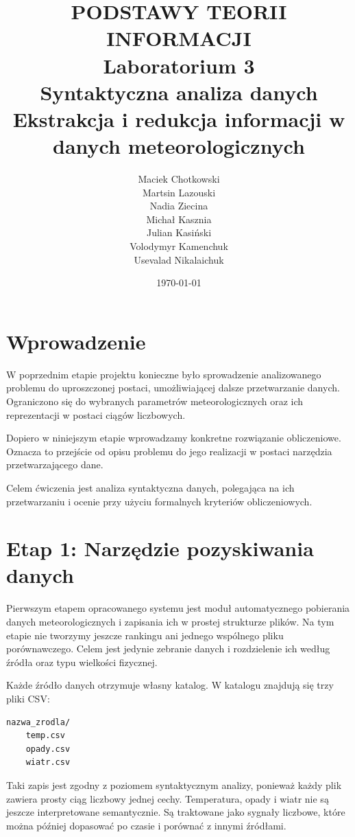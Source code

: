 \documentclass[a4paper,12pt]{article}
\title{
    \vspace{1.5cm}
    \textbf{PODSTAWY TEORII INFORMACJI}\\
    \vspace{1.5cm}
    Laboratorium 3\\
    Syntaktyczna analiza danych\\
    \vspace{1.5cm}
    \huge \textbf{Ekstrakcja i redukcja informacji w danych meteorologicznych}\\
    \vspace{1cm}
}
\author{
    Maciek Chotkowski \\ Martsin Lazouski \\ Nadia Ziecina \\
    Michał Kasznia \\ Julian Kasiński \\ Volodymyr Kamenchuk \\ Usevalad Nikalaichuk 
}
\date{\today}
\begin{document}
\maketitle
\newpage

\tableofcontents
\newpage


\section{Wprowadzenie}

W poprzednim etapie projektu konieczne było sprowadzenie analizowanego problemu do uproszczonej postaci, umożliwiającej dalsze przetwarzanie danych. Ograniczono się do wybranych parametrów meteorologicznych oraz ich reprezentacji w postaci ciągów liczbowych.

\noindent
Dopiero w niniejszym etapie wprowadzamy konkretne rozwiązanie obliczeniowe. Oznacza to przejście od opisu problemu do jego realizacji w postaci narzędzia przetwarzającego dane.

\noindent
Celem ćwiczenia jest analiza syntaktyczna danych, polegająca na ich przetwarzaniu i ocenie przy użyciu formalnych kryteriów obliczeniowych.


\section{Etap 1: Narzędzie pozyskiwania danych}

Pierwszym etapem opracowanego systemu jest moduł automatycznego pobierania
danych meteorologicznych i zapisania ich w prostej strukturze plików.
Na tym etapie nie tworzymy jeszcze rankingu ani jednego wspólnego pliku
porównawczego. Celem jest jedynie zebranie danych i rozdzielenie ich według
źródła oraz typu wielkości fizycznej.

\noindent
Każde źródło danych otrzymuje własny katalog. W katalogu znajdują się trzy
pliki CSV:
\begin{verbatim}
nazwa_zrodla/
    temp.csv
    opady.csv
    wiatr.csv
\end{verbatim}

\noindent
Taki zapis jest zgodny z poziomem syntaktycznym analizy, ponieważ każdy plik
zawiera prosty ciąg liczbowy jednej cechy. Temperatura, opady i wiatr nie są
jeszcze interpretowane semantycznie. Są traktowane jako sygnały liczbowe,
które można później dopasować po czasie i porównać z innymi źródłami.
\end{document}
